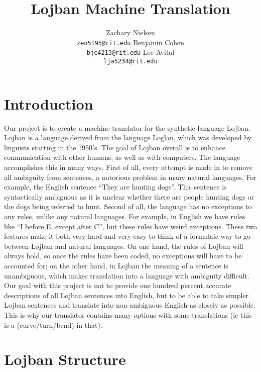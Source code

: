 \documentclass[11pt,letterpaper]{article}
\title{Lojban Machine Translation}
\author{Zachary Nielsen\\
	    {\tt zen5195@rit.edu}
	  \And
	Benjamin Cohen\\
              {\tt bjc4213@rit.edu}
	  \And
	Lee Avital\\
	   {\tt lja5234@rit.edu}}
\date{}
\begin{document}
\maketitle


\section{Introduction}

	Our project is to create a machine translator for the synthetic language Lojban. Lojban is a language derived from the language Loglan, which was developed by linguists starting in the 1950’s. The goal of Lojban overall is to enhance communication with other humans, as well as with computers. The language accomplishes this in many ways. First of all, every attempt is made in to remove all ambiguity from sentences, a notorious problem in many natural languages. For example, the English sentence “They are hunting dogs”.  This sentence is syntactically ambiguous as it is unclear whether there are people hunting dogs or the dogs being referred to hunt.  Second of all, the language has no exceptions to any rules, unlike any natural languages. For example, in English we have rules like “I before E, except after C”, but these rules have weird exceptions.  These two features make it both very hard and very easy to think of a formulaic way to go between Lojban and natural languages. On one hand, the rules of Lojban will always hold, so once the rules have been coded, no exceptions will have to be accounted for; on the other hand, in Lojban the meaning of a sentence is unambiguous, which makes translation into a language with ambiguity difficult. Our goal with this project is not to provide one hundred percent accurate descriptions of all Lojban sentences into English, but to be able to take simpler Lojban sentences and translate into non-ambiguous English as closely as possible.  This is why our translator contains many options with some translations (ie this is a (curve/turn/bend) in that).  

\section{Lojban Structure}
\end{document}
